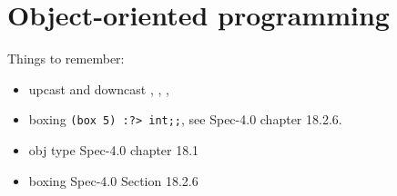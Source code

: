 \chapter{Object-oriented programming}
\label{chap:oop}
Things to remember: 
\begin{itemize}
\item upcast and downcast , \lexeme{:>},
  , 
\item boxing \lstinline|(box 5) :?> int;;|, see Spec-4.0 chapter
  18.2.6.
\item obj type Spec-4.0 chapter 18.1
\item boxing Spec-4.0 Section 18.2.6
\end{itemize}
